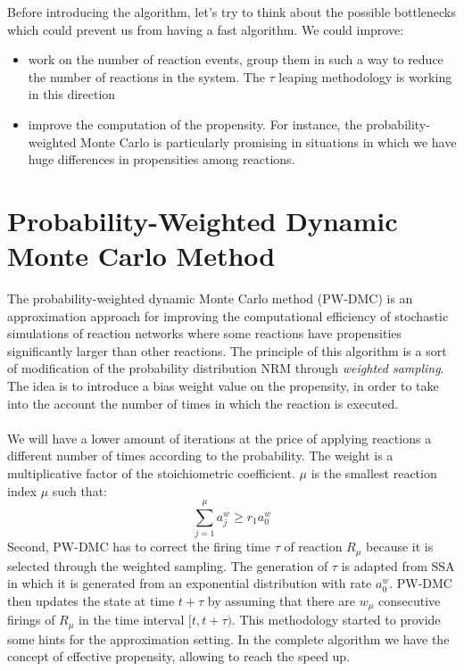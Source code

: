 \noindent
Before introducing the algorithm, let's try to think about the possible bottlenecks which could prevent us from having a fast algorithm.
We could improve:

\begin{itemize}
  \item work on the number of reaction events, group them in such a way to reduce the number of reactions in the system.
    The $\tau$ leaping methodology is working in this direction \item improve the computation of the propensity.
    For instance, the probability-weighted Monte Carlo is particularly promising in situations in which we have huge differences in propensities among reactions.
\end{itemize}

\section{Probability-Weighted Dynamic Monte Carlo Method}
The probability-weighted dynamic Monte Carlo method (PW-DMC) is an approximation approach for improving the computational efficiency of stochastic simulations of reaction networks where some reactions have propensities significantly larger than other reactions.
The principle of this algorithm is a sort of modification of the probability distribution NRM through \emph{weighted sampling}.
The idea is to introduce a bias weight value on the propensity, in order to take into the account the number of times in which the reaction is executed.
\\
\\
\noindent
We will have a lower amount of iterations at the price of applying reactions a different number of times according to the probability.
The weight is a multiplicative factor of the stoichiometric coefficient.
$\mu$ is the smallest reaction index $\mu$ such that: $$ \sum^{\mu}_{j=1}a^w_j \geq r_1 a^w_0 $$ Second, PW-DMC has to correct the firing time $\tau$ of reaction $R_\mu$ because it is selected through the weighted sampling.
The generation of $\tau$ is adapted from SSA in which it is generated from an exponential distribution with rate $a^w_0$.
PW-DMC then updates the state at time $t + \tau$ by assuming that there are $w_\mu$ consecutive firings of $R_\mu$ in the time interval $[t,t + \tau)$.
This methodology started to provide some hints for the approximation setting.
In the complete algorithm we have the concept of effective propensity, allowing to reach the speed up.

